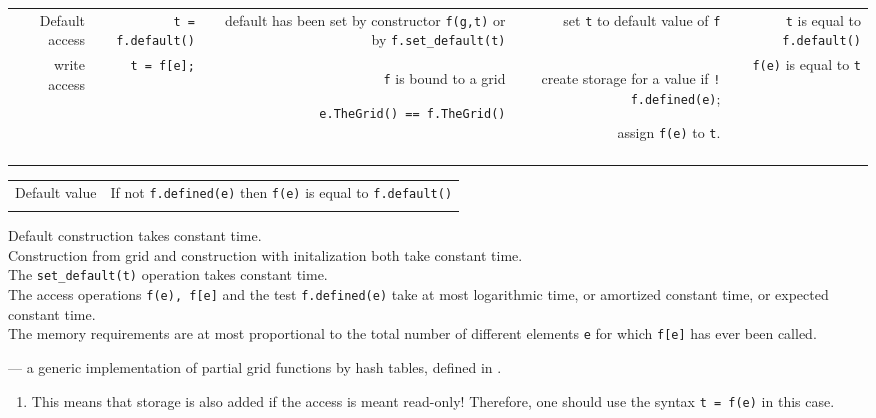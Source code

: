 \begin{tabularx}{15cm}{RRRRR}
    Default access &
    {\tt t = f.default()} &
    default has been set by constructor {\tt f(g,t)} 
    or by  {\tt f.set\_default(t)} &
    set {\tt t} to  default value of {\tt f} &
    {\tt t} is equal to {\tt f.default()} 
   \\
    write access &
    {\tt t = f[e];} &
    {\tt f} is bound to a grid
    \par {\tt e.TheGrid() == f.TheGrid()} &
    create storage for a value
    if  {\tt ! f.defined(e)};
    \par assign  {\tt f(e)} to  {\tt t}. &
    {\tt f(e)} is equal to {\tt t}
   \T\\
   \T\hline
   \T\\
 \end{tabularx}

 \begin{tabular}{ll} 
   \hline
   Default value &
   If not  {\tt f.defined(e)} then  {\tt f(e)} is equal to {\tt f.default()}  
   \T\\ 
   \T\hline
 \end{tabular}

 Default construction takes constant time.
 \\
 Construction from grid and construction with initalization both
 take constant time.
 \\
 The {\tt set\_default(t)} operation takes constant time.
 \\
 The access operations {\tt f(e), f[e]} and the test  {\tt f.defined(e)}
 take at most logarithmic time, or amortized constant time, or expected constant time.
 \\
 The memory requirements are at most proportional to the total number of different
 elements {\tt e} for which {\tt f[e]} has ever been called.
 
 --- a generic implementation of partial grid functions by hash tables,
 defined in
 .


 \begin{enumerate}
 \item {}
   This means that storage is also added if the access is meant read-only!
   Therefore, one should use the syntax {\tt t = f(e)} in this case.
 \end{enumerate}
 
  ~
  ~
  ~
  ~
  ~
  

